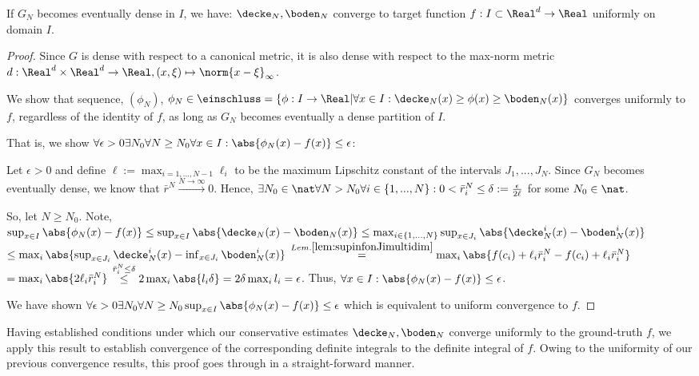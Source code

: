 \begin{thm}
If $G_N$ becomes eventually dense in $I$, we have: $\decke_N, \boden_N$ converge to target function $f: I\subset \Real^d \to \Real$ uniformly on domain $I$.

\begin{proof}

Since $G$ is dense with respect to a canonical metric, it is also dense with respect to the max-norm metric $d: \Real^d \times \Real^d \to \Real, (x,\xi) \mapsto \norm{x-\xi}_{\infty}$.

We show that sequence, $(\phi_N)$, $\phi_N \in \einschluss = \{ \phi: I \to \Real | \forall x \in I : \decke_N(x) \geq \phi(x) \geq \boden_N(x) \}$ converges uniformly to $f$, regardless of the identity of $f$, as long as $G_N$ becomes eventually a dense partition of $I$. 

That is, we show $\forall \epsilon >0 \exists N_0 \forall N \geq N_0 \forall x \in I : \abs{\phi_N(x) - f(x)} \leq \epsilon$:
 

Let $\epsilon > 0$ and define $\ell := \max_{i=1,...,N-1} \ell_i$ to be the maximum Lipschitz constant of the intervals $J_1,...,J_N$. Since $G_N$ becomes eventually dense, we know that $\bar r^N \stackrel{N \to \infty}{\longrightarrow} 0 $. Hence, $\exists N_0 \in \nat \forall N > N_0 \forall i \in \{1,...,N\}: 0< \bar r_i^N \leq \delta:=\frac{\epsilon}{2 \ell} $ for some $N_0 \in \nat$.


So, let $N \geq N_0$. 
Note, $\sup_{ x \in I} \abs{\phi_N(x) - f(x)} \leq \sup_{ x \in I} \abs{\decke_N(x) - \boden_N (x)} \leq \max_{i\in \{1,...,N\}} \sup_{ x \in J_i} \abs{\decke_N^i(x) - \boden_N^i (x)}$
$\leq \max_{i}  \abs{\sup_{ x \in J_i}\decke_N^i(x) - \inf_{ x \in J_i} \boden_N^i (x)}$
$\stackrel{Lem. \ref{lem:supinfonJimultidim}}{=} \max_i \abs{ f(c_i) + \ell_i \bar r_i^N - f(c_i) + \ell_i \bar r_i^N}$
$=\max_i \abs{ 2 \ell_i \bar r_i^N}$
$\stackrel{\bar r_i^N \leq \delta}{\leq} 2 \max_i \abs{ l_i \delta } = 2 \delta \max_i l_i = \epsilon$.
Thus, $\forall x \in I: \abs{\phi_N(x) - f(x)} \leq \epsilon$.

We have shown  $\forall \epsilon >0 \exists N_0 \forall N \geq N_0  \sup_{x \in I} \abs{\phi_N(x) - f(x)} \leq \epsilon$ which is equivalent to uniform convergence to $f$.


\end{proof}

\end{thm}

Having established conditions under which our conservative estimates $\decke_N, \boden_N$ converge uniformly to the ground-truth $f$, we apply this result to establish convergence of the corresponding definite integrals to the definite integral of $f$. Owing to the uniformity of our previous convergence results, this proof goes through in a straight-forward manner. 



